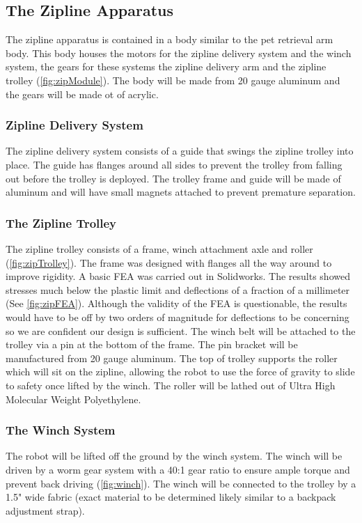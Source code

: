 \documentclass[11pt, oneside]{article} %
\begin{document}
	\newpage
	\subsection{The Zipline Apparatus}
	The zipline apparatus is contained in a body similar to the pet retrieval arm body. This body houses the motors for the zipline delivery system and the winch system, the gears for these systems the zipline delivery arm and the zipline trolley (\autoref{fig:zipModule}). The body will be made from 20 gauge aluminum and the gears will be made ot of acrylic.
	
		\subsubsection{Zipline Delivery System}
		The zipline delivery system consists of a guide that swings the zipline trolley into place. The guide has flanges around all sides to prevent the trolley from falling out before the trolley is deployed. The trolley frame and guide will be made of aluminum and will have small magnets attached to prevent premature separation.
		
		\subsubsection{The Zipline Trolley}
		The zipline trolley consists of a frame, winch attachment axle and roller (\autoref{fig:zipTrolley}). The frame was designed with flanges all the way around to improve rigidity. A basic FEA was carried out in Solidworks. The results showed stresses much below the plastic limit and deflections of a fraction of a millimeter (See \autoref{fig:zipFEA}). Although the validity of the FEA is questionable, the results would have to be off by two orders of magnitude for deflections to be concerning so we are confident our design is sufficient. The winch belt will be attached to the trolley via a pin at the bottom of the frame. The pin bracket will be manufactured from 20 gauge aluminum. The top of trolley supports the roller which will sit on the zipline, allowing the robot to use the force of gravity to slide to safety once lifted by the winch. The roller will be lathed out of Ultra High Molecular Weight Polyethylene.
		
		\subsubsection{The Winch System}
		The robot will be lifted off the ground by the winch system. The winch will be driven by a worm gear system with a 40:1 gear ratio to ensure ample torque and prevent back driving (\autoref{fig:winch}). The winch will be connected to the trolley by a 1.5" wide fabric (exact material to be determined likely similar to a backpack adjustment strap). 
		
\end{document}

